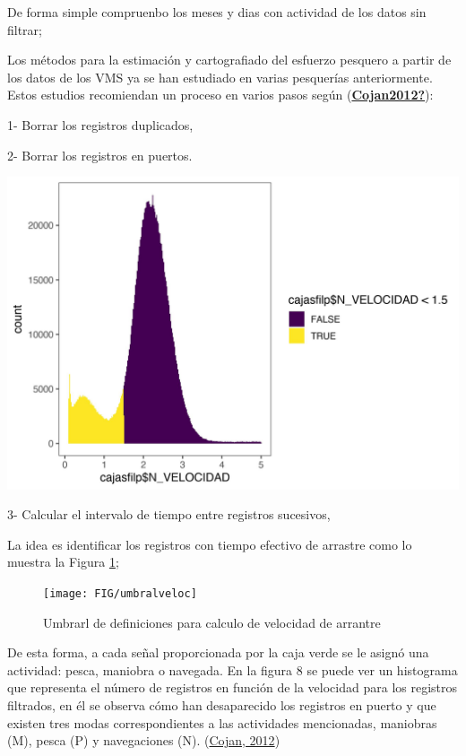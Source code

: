 \documentclass[
]{article}
\begin{document}
De forma simple compruenbo los meses y dias con actividad de los datos sin filtrar;

Los métodos para la estimación y cartografiado del esfuerzo pesquero a partir de los datos de los VMS ya se han estudiado en varias pesquerías anteriormente. Estos estudios recomiendan un proceso en varios pasos según (\protect\hyperlink{ref-Cojan2012}{\textbf{Cojan2012?}}):

1- Borrar los registros duplicados,

2- Borrar los registros en puertos.

\begin{center}\includegraphics{SAR_Method_files/figure-latex/unnamed-chunk-8-1} \end{center}

3- Calcular el intervalo de tiempo entre registros sucesivos,

La idea es identificar los registros con tiempo efectivo de arrastre como lo muestra la Figura \ref{fig:esq};

\begin{figure}

{\centering \texttt{[image: FIG/umbralveloc]} 

}

\caption{\label{esq}Umbrarl de definiciones para calculo de velocidad de arrantre}\label{fig:esq}
\end{figure}

De esta forma, a cada señal proporcionada por la caja verde se le asignó una actividad: pesca, maniobra o navegada. En la figura 8 se puede ver un histograma que representa el número de registros en función de la velocidad para los registros filtrados, en él se observa cómo han desaparecido los registros en puerto y que existen tres modas correspondientes a las actividades mencionadas, maniobras (M), pesca (P) y navegaciones (N). (\protect\hyperlink{ref-Cohan2012}{Cojan, 2012})
\end{document}
